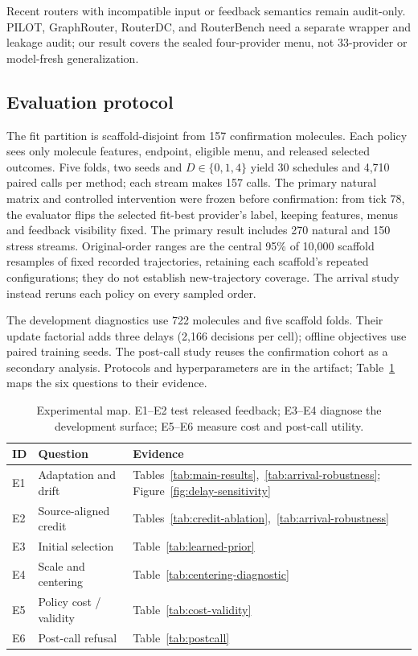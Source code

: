 \documentclass[sigconf,anonymous]{aamas}
\newcommand{\MiraTableFont}{\fontsize{9}{11}\selectfont}
\begin{document}
Recent routers with incompatible input or feedback semantics remain audit-only. PILOT, GraphRouter, RouterDC, and RouterBench need a separate wrapper and leakage audit; our result covers the sealed four-provider menu, not 33-provider or model-fresh generalization.

\subsection{Evaluation protocol}
The fit partition is scaffold-disjoint from 157 confirmation molecules. Each policy sees only molecule features, endpoint, eligible menu, and released selected outcomes. Five folds, two seeds and $D\in\{0,1,4\}$ yield 30 schedules and 4,710 paired calls per method; each stream makes 157 calls. The primary natural matrix and controlled intervention were frozen before confirmation: from tick 78, the evaluator flips the selected fit-best provider's label, keeping features, menus and feedback visibility fixed. The primary result includes 270 natural and 150 stress streams. Original-order ranges are the central 95\% of 10,000 scaffold resamples of fixed recorded trajectories, retaining each scaffold's repeated configurations; they do not establish new-trajectory coverage. The arrival study instead reruns each policy on every sampled order.

The development diagnostics use 722 molecules and five scaffold folds. Their update factorial adds three delays (2,166 decisions per cell); offline objectives use paired training seeds. The post-call study reuses the confirmation cohort as a secondary analysis. Protocols and hyperparameters are in the artifact; Table~\ref{tab:matrix} maps the six questions to their evidence.

\begin{table}[t]
\caption{Experimental map. E1--E2 test released feedback; E3--E4 diagnose the development surface; E5--E6 measure cost and post-call utility.}
\label{tab:matrix}
\MiraTableFont
\setlength{\tabcolsep}{3pt}
\begin{tabular}{@{}llp{}@{}}
\toprule
ID & Question & Evidence \\
\midrule
E1 & Adaptation and drift & Tables~\ref{tab:main-results},~\ref{tab:arrival-robustness}; Figure~\ref{fig:delay-sensitivity} \\
E2 & Source-aligned credit & Tables~\ref{tab:credit-ablation},~\ref{tab:arrival-robustness} \\
E3 & Initial selection & Table~\ref{tab:learned-prior} \\
E4 & Scale and centering & Table~\ref{tab:centering-diagnostic} \\
E5 & Policy cost / validity & Table~\ref{tab:cost-validity} \\
E6 & Post-call refusal & Table~\ref{tab:postcall} \\
\bottomrule
\end{tabular}
\end{table}
\end{document}
